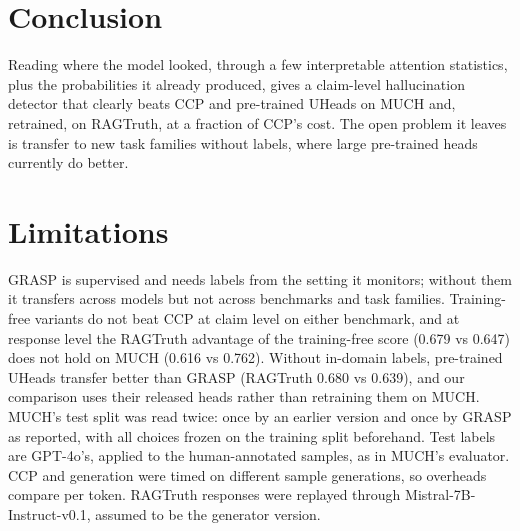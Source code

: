 \documentclass[11pt]{article}
\begin{document}
\section{Conclusion}
Reading where the model looked, through a few interpretable attention statistics, plus the
probabilities it already produced, gives a claim-level hallucination detector that clearly beats
CCP and pre-trained UHeads on MUCH and, retrained, on RAGTruth, at a fraction of CCP's cost. The
open problem it leaves is transfer to new task families without labels, where large pre-trained
heads currently do better.

\section*{Limitations}
GRASP is supervised and needs labels from the setting it monitors; without them it transfers
across models but not across benchmarks and task families. Training-free variants do not beat
CCP at claim level on either benchmark, and at response level the RAGTruth advantage of the
training-free score (0.679 vs 0.647) does not hold on MUCH (0.616 vs 0.762). Without in-domain
labels, pre-trained UHeads transfer better than GRASP (RAGTruth 0.680 vs 0.639), and our
comparison uses their released heads rather than retraining them on MUCH. MUCH's test split was
read twice: once by an earlier version and once by GRASP as reported, with all choices frozen on
the training split beforehand. Test labels are GPT-4o's, applied to the human-annotated samples, as
in MUCH's evaluator. CCP and generation were timed on different sample generations, so overheads
compare per token. RAGTruth responses were replayed through Mistral-7B-Instruct-v0.1, assumed to
be the generator version.



\end{document}
